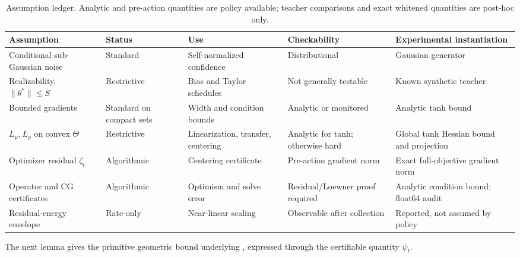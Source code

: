 \documentclass[twoside]{article}
\begin{document}
\begin{table}[h]
\centering\footnotesize
\begin{tabular}{p{}p{}p{}p{}p{}}
\toprule
Assumption & Status & Use & Checkability & Experimental instantiation\\
\midrule
Conditional sub-Gaussian noise & Standard & Self-normalized confidence & Distributional & Gaussian generator\\
Realizability, $\|\theta^*\|\le S$ & Restrictive & Bias and Taylor schedules & Not generally testable & Known synthetic teacher\\
Bounded gradients & Standard on compact sets & Width and condition bounds & Analytic or monitored & Analytic tanh bound\\
$L_\mu,L_g$ on convex $\Theta$ & Restrictive & Linearization, transfer, centering & Analytic for tanh; otherwise hard & Global tanh Hessian bound and projection\\
Optimizer residual $\zeta_t$ & Algorithmic & Centering certificate & Pre-action gradient norm & Exact full-objective gradient norm\\
Operator and CG certificates & Algorithmic & Optimism and solve error & Residual/Loewner proof required & Analytic condition bound; float64 audit\\
Residual-energy envelope & Rate-only & Near-linear scaling & Observable after collection & Reported, not assumed by policy\\
\bottomrule
\end{tabular}
\caption{Assumption ledger.  Analytic and pre-action quantities are policy
available; teacher comparisons and exact whitened quantities are post-hoc only.}
\label{tab:assumptions}
\end{table}

The next lemma gives the primitive geometric bound underlying
, expressed through the certifiable quantity $\psi_t$.
\end{document}
